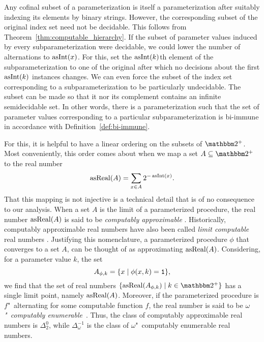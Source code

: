 Any cofinal subset of a parameterization is itself a parameterization after suitably indexing its elements by binary strings.
However, the corresponding subset of the original index set need not be decidable.
This follows from Theorem~\ref{thm:computable_hierarchy}.
If the subset of parameter values induced by every subparameterization were decidable, we could lower the number of alternations to $\operatorname{asInt}(x)$.
For this, set the $\operatorname{asInt}(k)$th element of the subparameterization to one of the original after which no decisions about the first $\operatorname{asInt}(k)$ instances changes.
We can even force the subset of the index set corresponding to a subparameterization to be particularly undecidable.
The subset can be made so that it nor its complement contains an infinite semidecidable set.
In other words, there is a parameterization such that the set of parameter values corresponding to a particular subparameterization is bi-immune in accordance with Definition~\ref{def:bi-immune}.

For this, it is helpful to have a linear ordering on the subsets of $\binary^+$.
Most conveniently, this order comes about when we map a set $A \subseteq \binary^+$ to the real number
\begin{equation*}
  \operatorname{asReal}(A) = \sum_{x \in A} 2^{-\operatorname{asInt}(x)}.
\end{equation*}
That this mapping is not injective is a technical detail that is of no consequence to our analysis.
When a set $A$ is the limit of a parameterized procedure, the real number $\operatorname{asReal}(A)$ is said to be \emph{computably approximable} \parencite{ambos-spies2000weakly}.
Historically, computably approximable real numbers have also been called \emph{limit computable} real numbers \parencite{gold1965limiting}.
Justifying this nomenclature, a parameterized procedure $\phi$ that converges to a set $A$, can be thought of as approximating $\operatorname{asReal}(A)$.
Considering, for a parameter value $k$, the set
\begin{equation*}
  A_{\phi, k} = \{x \;|\; \phi(x, k) = \textnormal{\texttt{1}}\},
\end{equation*}
we find that the set of real numbers $\{\asReal(A_{\phi, k}) \st k \in \binary^+\}$ has a single limit point, namely $\operatorname{asReal}(A)$.
Moreover, if the parameterized procedure is $f$"~alternating for some computable function $f$, the real number is said to be \emph{$\omega$"~computably enumerable}~\parencite{ambos-spies2000weakly}.
Thus, the class of computably approximable real numbers is $\Delta^0_2$, while $\Delta^{-1}_\omega$ is the class of $\omega$"~computably enumerable real numbers.


